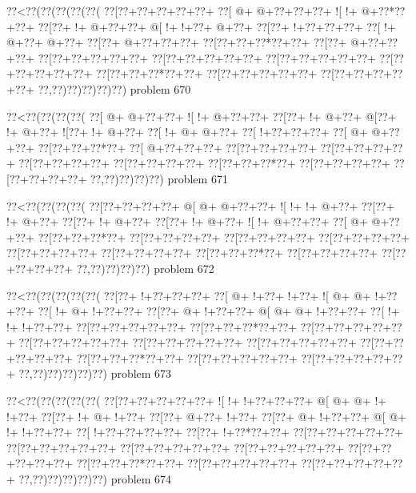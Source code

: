 \vbox{\vbox{\goo
\0??<\0??(\0??(\0??(\0??(\0??(
\0??[\0??+\0??+\0??+\0??+\0??+
\0??[\- @+\- @+\0??+\0??+\0??+
\- ![\- !+\- @+\0??*\0??+\0??+
\0??[\0??+\- !+\- @+\0??+\0??+
\- @[\- !+\- !+\0??+\- @+\0??+
\0??[\0??+\- !+\0??+\0??+\0??+
\0??[\- !+\- @+\0??+\- @+\0??+
\0??[\0??+\- @+\0??+\0??+\0??+
\0??[\0??+\0??+\0??*\0??+\0??+
\0??[\0??+\- @+\0??+\0??+\0??+
\0??[\0??+\0??+\0??+\0??+\0??+
\0??[\0??+\0??+\0??+\0??+\0??+
\0??[\0??+\0??+\0??+\0??+\0??+
\0??[\0??+\0??+\0??+\0??+\0??+
\0??[\0??+\0??+\0??*\0??+\0??+
\0??[\0??+\0??+\0??+\0??+\0??+
\0??[\0??+\0??+\0??+\0??+\0??+
\0??,\0??)\0??)\0??)\0??)\0??)
}
\hfil problem 670\hfil\break
}

\vbox{\vbox{\goo
\0??<\0??(\0??(\0??(\0??(
\0??[\- @+\- @+\0??+\0??+
\- ![\- !+\- @+\0??+\0??+
\0??[\0??+\- !+\- @+\0??+
\- @[\0??+\- !+\- @+\0??+
\- ![\0??+\- !+\- @+\0??+
\0??[\- !+\- @+\- @+\0??+
\0??[\- !+\0??+\0??+\0??+
\0??[\- @+\- @+\0??+\0??+
\0??[\0??+\0??+\0??*\0??+
\0??[\- @+\0??+\0??+\0??+
\0??[\0??+\0??+\0??+\0??+
\0??[\0??+\0??+\0??+\0??+
\0??[\0??+\0??+\0??+\0??+
\0??[\0??+\0??+\0??+\0??+
\0??[\0??+\0??+\0??*\0??+
\0??[\0??+\0??+\0??+\0??+
\0??[\0??+\0??+\0??+\0??+
\0??,\0??)\0??)\0??)\0??)
}
\hfil problem 671\hfil\break
}

\vbox{\vbox{\goo
\0??<\0??(\0??(\0??(\0??(
\0??[\0??+\0??+\0??+\0??+
\- @[\- @+\- @+\0??+\0??+
\- ![\- !+\- !+\- @+\0??+
\0??[\0??+\- !+\- @+\0??+
\0??[\0??+\- !+\- @+\0??+
\0??[\0??+\- !+\- @+\0??+
\- ![\- !+\- @+\0??+\0??+
\0??[\- @+\- @+\0??+\0??+
\0??[\0??+\0??+\0??*\0??+
\0??[\0??+\0??+\0??+\0??+
\0??[\0??+\0??+\0??+\0??+
\0??[\0??+\0??+\0??+\0??+
\0??[\0??+\0??+\0??+\0??+
\0??[\0??+\0??+\0??+\0??+
\0??[\0??+\0??+\0??*\0??+
\0??[\0??+\0??+\0??+\0??+
\0??[\0??+\0??+\0??+\0??+
\0??,\0??)\0??)\0??)\0??)
}
\hfil problem 672\hfil\break
}

\vbox{\vbox{\goo
\0??<\0??(\0??(\0??(\0??(\0??(
\0??[\0??+\- !+\0??+\0??+\0??+
\0??[\- @+\- !+\0??+\- !+\0??+
\- ![\- @+\- @+\- !+\0??+\0??+
\0??[\- !+\- @+\- !+\0??+\0??+
\0??[\0??+\- @+\- !+\0??+\0??+
\- @[\- @+\- @+\- !+\0??+\0??+
\0??[\- !+\- !+\- !+\0??+\0??+
\0??[\0??+\0??+\0??+\0??+\0??+
\0??[\0??+\0??+\0??*\0??+\0??+
\0??[\0??+\0??+\0??+\0??+\0??+
\0??[\0??+\0??+\0??+\0??+\0??+
\0??[\0??+\0??+\0??+\0??+\0??+
\0??[\0??+\0??+\0??+\0??+\0??+
\0??[\0??+\0??+\0??+\0??+\0??+
\0??[\0??+\0??+\0??*\0??+\0??+
\0??[\0??+\0??+\0??+\0??+\0??+
\0??[\0??+\0??+\0??+\0??+\0??+
\0??,\0??)\0??)\0??)\0??)\0??)
}
\hfil problem 673\hfil\break
}

\vbox{\vbox{\goo
\0??<\0??(\0??(\0??(\0??(\0??(
\0??[\0??+\0??+\0??+\0??+\0??+
\- ![\- !+\- !+\0??+\0??+\0??+
\- @[\- @+\- @+\- !+\- !+\0??+
\0??[\0??+\- !+\- @+\- !+\0??+
\0??[\0??+\- @+\0??+\- !+\0??+
\0??[\0??+\- @+\- !+\0??+\0??+
\- @[\- @+\- !+\- !+\0??+\0??+
\0??[\- !+\0??+\0??+\0??+\0??+
\0??[\0??+\- !+\0??*\0??+\0??+
\0??[\0??+\0??+\0??+\0??+\0??+
\0??[\0??+\0??+\0??+\0??+\0??+
\0??[\0??+\0??+\0??+\0??+\0??+
\0??[\0??+\0??+\0??+\0??+\0??+
\0??[\0??+\0??+\0??+\0??+\0??+
\0??[\0??+\0??+\0??*\0??+\0??+
\0??[\0??+\0??+\0??+\0??+\0??+
\0??[\0??+\0??+\0??+\0??+\0??+
\0??,\0??)\0??)\0??)\0??)\0??)
}
\hfil problem 674\hfil\break
}

